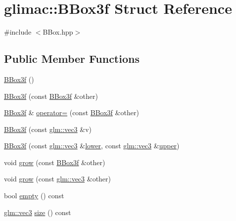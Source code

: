 \hypertarget{structglimac_1_1_b_box3f}{}\section{glimac\+:\+:B\+Box3f Struct Reference}
\label{structglimac_1_1_b_box3f}


{\ttfamily \#include $<$B\+Box.\+hpp$>$}

\subsection*{Public Member Functions}
\begin{DoxyCompactItemize}
\item 
\hyperlink{structglimac_1_1_b_box3f_ad465498ccf0a9b58990864bbc229ea5c}{B\+Box3f} ()
\item 
\hyperlink{structglimac_1_1_b_box3f_aa28fa2e34e2ecda8936aab0f4e2bfe76}{B\+Box3f} (const \hyperlink{structglimac_1_1_b_box3f}{B\+Box3f} \&other)
\item 
\hyperlink{structglimac_1_1_b_box3f}{B\+Box3f} \& \hyperlink{structglimac_1_1_b_box3f_aac86d7db2775def5999a06dd10da81c8}{operator=} (const \hyperlink{structglimac_1_1_b_box3f}{B\+Box3f} \&other)
\item 
\hyperlink{structglimac_1_1_b_box3f_a76a193184d30bf08bc8725885ed19ef0}{B\+Box3f} (const \hyperlink{group__core__types_ga1c47e8b3386109bc992b6c48e91b0be7}{glm\+::vec3} \&v)
\item 
\hyperlink{structglimac_1_1_b_box3f_abf2d788fa66847dac227a2669ebe9d30}{B\+Box3f} (const \hyperlink{group__core__types_ga1c47e8b3386109bc992b6c48e91b0be7}{glm\+::vec3} \&\hyperlink{structglimac_1_1_b_box3f_a6416c303ada3a2433fb742021e021c27}{lower}, const \hyperlink{group__core__types_ga1c47e8b3386109bc992b6c48e91b0be7}{glm\+::vec3} \&\hyperlink{structglimac_1_1_b_box3f_a5446e619162abd8011cab858f98d1954}{upper})
\item 
void \hyperlink{structglimac_1_1_b_box3f_adce98ea70025deadd71e0467435d654a}{grow} (const \hyperlink{structglimac_1_1_b_box3f}{B\+Box3f} \&other)
\item 
void \hyperlink{structglimac_1_1_b_box3f_a37342deeeba63916f701037ac1acc002}{grow} (const \hyperlink{group__core__types_ga1c47e8b3386109bc992b6c48e91b0be7}{glm\+::vec3} \&other)
\item 
bool \hyperlink{structglimac_1_1_b_box3f_a96444ed68bfab6e7c648467f2e8f9218}{empty} () const
\item 
\hyperlink{group__core__types_ga1c47e8b3386109bc992b6c48e91b0be7}{glm\+::vec3} \hyperlink{structglimac_1_1_b_box3f_aca6b2f64a4a904fe8b42a8121ee7f087}{size} () const
\end{DoxyCompactItemize}
